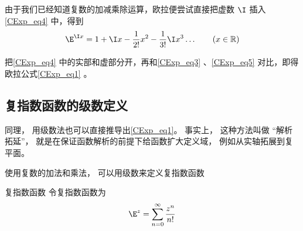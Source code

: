 由于我们已经知道复数的加减乘除运算，欧拉便尝试直接把虚数 $\I$ 插入\autoref{CExp_eq4}  中，得到
\begin{equation}\label{CExp_eq4}
\E^{\I x} =1 + \I x - \frac{1}{2!} x^2 - \frac{1}{3!} \I x^3  \ldots
\qquad (x \in \mathbb R)
\end{equation}

把\autoref{CExp_eq4} 中的实部和虚部分开，再和\autoref{CExp_eq3} 、\autoref{CExp_eq5} 对比，即得欧拉公式\autoref{CExp_eq1} 。

\subsection{复指数函数的级数定义}
同理， 用级数法也可以直接推导出\autoref{CExp_eq1}。 事实上， 这种方法叫做 “解析拓延”， 就是在保证函数解析的前提下给函数扩大定义域， 例如从实轴拓展到复平面。

使用复数的加法和乘法， 可以用级数来定义复指数函数
\begin{definition}{复指数函数}
令复指数函数为
\begin{equation}
\E^z = \sum_{n=0}^\infty \frac{z^n}{n!}
\end{equation}
\end{definition}
